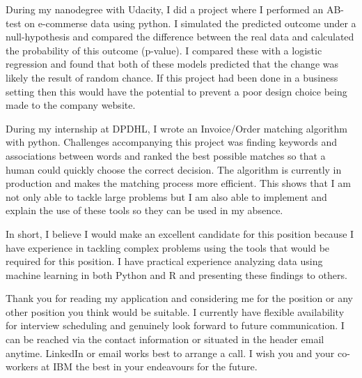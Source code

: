 \documentclass[11pt, a4paper]{awesome-cv}
\begin{document}
\begin{cvletter}
  During my nanodegree with Udacity, I did a project where I performed an AB-test on e-commerse data using
  python. I simulated the predicted outcome under a null-hypothesis and compared
  the difference between the real data and calculated the probability of this
  outcome (p-value). I compared these with a logistic regression and found that
  both of these models predicted that the change was likely the result of random
  chance. If this project had been done in a business setting then this would
  have the potential to prevent a poor design choice being made to the company
  website.

  During my internship at DPDHL, I wrote an Invoice/Order matching algorithm
  with python. Challenges accompanying this project was finding keywords and
  associations between words and ranked the best possible matches so that a
  human could quickly choose the correct decision. The algorithm is currently in
  production and makes the matching process more efficient. This shows that I am
  not only able to tackle large problems but I am also able to implement and
  explain the use of these tools so they can be used in my absence.

  In short, I believe I would make an excellent candidate for this position
  because I have experience in tackling complex problems using the tools that
  would be required for this position. I have practical experience analyzing
  data using machine learning in both Python and R and presenting these findings
  to others.

  Thank you for reading my application and considering me for the position or
  any other position you think would be suitable. I currently have flexible
  availability for interview scheduling and genuinely look forward to future
  communication. I can be reached via the contact information or situated in the
  header email anytime. LinkedIn or email works best to arrange a call. I wish
  you and your co-workers at IBM the best in your endeavours for the future.


\end{cvletter}

\makeletterclosing
\end{document}
